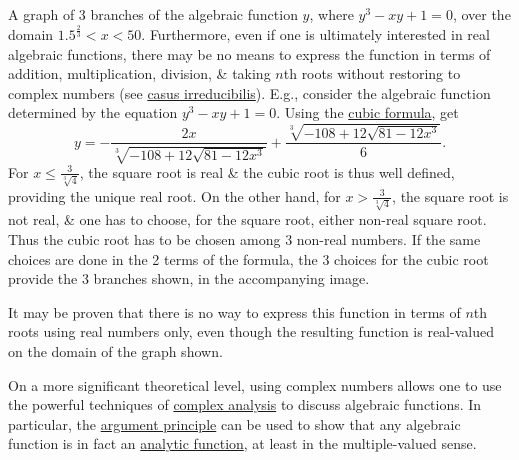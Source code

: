 \documentclass{article}
\begin{document}
\begin{itemize}
	{\sf A graph of 3 branches of the algebraic function $y$, where $y^3 - xy + 1 = 0$, over the domain $1.5^{\frac{2}{3}} < x < 50$.} Furthermore, even if one is ultimately interested in real algebraic functions, there may be no means to express the function in terms of addition, multiplication, division, \& taking $n$th roots without restoring to complex numbers (see \href{https://en.wikipedia.org/wiki/Casus_irreducibilis}{casus irreducibilis}). E.g., consider the algebraic function determined by the equation $y^3 - xy + 1 = 0$. Using the \href{https://en.wikipedia.org/wiki/Cubic_formula}{cubic formula}, get
	\begin{equation}
		y = -\frac{2x}{\sqrt[3]{-108 + 12\sqrt{81 - 12x^3}}} + \frac{\sqrt[3]{-108 + 12\sqrt{81 - 12x^3}}}{6}.
	\end{equation}
	For $x\le\frac{3}{\sqrt[3]{4}}$, the square root is real \& the cubic root is thus well defined, providing the unique real root. On the other hand, for $x > \frac{3}{\sqrt[3]{4}}$, the square root is not real, \& one has to choose, for the square root, either non-real square root. Thus the cubic root has to be chosen among 3 non-real numbers. If the same choices are done in the 2 terms of the formula, the 3 choices for the cubic root provide the 3 branches shown, in the accompanying image.
	
	It may be proven that there is no way to express this function in terms of $n$th roots using real numbers only, even though the resulting function is real-valued on the domain of the graph shown.
	
	On a more significant theoretical level, using complex numbers allows one to use the powerful techniques of \href{https://en.wikipedia.org/wiki/Complex_analysis}{complex analysis} to discuss algebraic functions. In particular, the \href{https://en.wikipedia.org/wiki/Argument_principle}{argument principle} can be used to show that any algebraic function is in fact an \href{https://en.wikipedia.org/wiki/Analytic_function}{analytic function}, at least in the multiple-valued sense.
	

\end{itemize}
\end{document}
